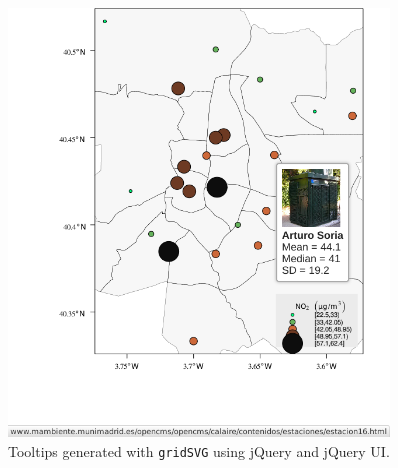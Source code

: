 \begin{figure}
\includegraphics[width=0.9\textwidth]{figs/airMadridTooltip.png}
\caption{\label{fig:airMadridTooltip}Tooltips generated with \texttt{gridSVG} using jQuery and jQuery UI.}
\end{figure}
